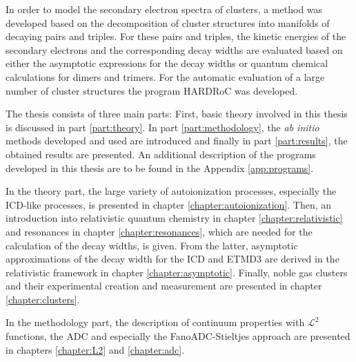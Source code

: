 In order to model the secondary electron spectra of clusters, a method
was developed based on the decomposition of cluster structures into manifolds
of decaying pairs and triples. For these pairs and triples, the kinetic energies
of the secondary electrons and the corresponding decay widths are evaluated based
on either the asymptotic expressions for the decay widths or quantum chemical
calculations for dimers and trimers. For the automatic evaluation of
a large number of cluster structures the program
\ac{HARDRoC} \cite{HARDRoC} was developed.

The thesis consists of three main parts:
First, basic theory involved in this thesis is discussed in part
\ref{part:theory}. In part \ref{part:methodology}, the
\emph{ab initio} methods developed and used are introduced and
finally in part \ref{part:results}, the obtained results are presented.
An additional description of the programs developed in this thesis are to
be found in the Appendix \ref{app:programs}.

In the theory part, the large variety of autoionization processes,
especially the \ac{ICD}-like processes, is presented in chapter
\ref{chapter:autoionization}. Then, an introduction
into relativistic quantum chemistry in chapter \ref{chapter:relativistic}
and resonances in chapter \ref{chapter:resonances}, which are needed for
the calculation of the decay widths, is given. From the latter, asymptotic
approximations of the decay width for the \ac{ICD} and ETMD3 are derived
in the relativistic framework in chapter \ref{chapter:asymptotic}.
Finally, noble gas clusters and their experimental creation and measurement
are presented in chapter \ref{chapter:clusters}.

In the methodology part, the description of continuum
properties with $\mathcal{L}^2$
functions, the \ac{ADC} and especially the FanoADC-Stieltjes approach are
presented in chapters \ref{chapter:L2} and \ref{chapter:adc}.

